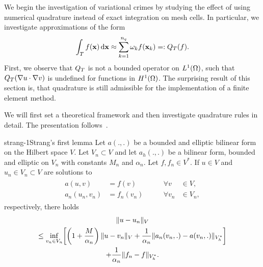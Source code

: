 \begin{intro}
  We begin the investigation of variational crimes by studying the
  effect of using numerical quadrature instead of exact integration on
  mesh cells. In particular, we investigate approximations of the form
  \begin{gather}
    \int_T f(\mathbf x)\,\mathrm{d} \mathbf x
    \approx \sum_{k=1}^{n_q} \omega_k f(\mathbf x_k) =: Q_T(f).
  \end{gather}
  First, we observe that $Q_T$ is not a bounded operator on
  $L^1(\Omega)$, such that $Q_T(\nabla u\cdot \nabla v)$ is
  undefined for functions in $H^1(\Omega)$. The surprising result of
  this section is, that quadrature is still admissible for the
  implementation of a finite element method.

  We will first set a theoretical framework and then investigate
  quadrature rules in detail. The presentation follows~\cite[Chapter
  4]{Ciarlet78}.
\end{intro}

\begin{Lemma*}{strang-1}{Strang's first lemma}
  Let $a(.,.)$ be a bounded and elliptic bilinear form on the Hilbert
  space $V$. Let $V_n\subset V$ and let $a_h(.,.)$ be a bilinear form,
  bounded and elliptic on $V_n$ with constants $M_n$ and
  $\alpha_n$. Let $f, f_n\in V^*$. If $u \in V$ and
  $u_n\in V_n \subset V$ are solutions to
  \begin{gather*}
    \begin{aligned}
      a(u,v) &= f(v) & \qquad\forall v&\in V,\\
      a_n(u_n,v_n) &= f_n(v_n) & \qquad\forall v_n&\in V_n,
    \end{aligned}
  \end{gather*}
  respectively, there holds
  \begin{multline}
    \lVert u-u_n\rVert_V \\
    \le \inf_{v_n\in V_n}\biggl[\left(1+\frac{M}{\alpha_n}\right)
    \lVert u-v_n\rVert_V
    + \frac1{\alpha_n}
    \lVert a_n(v_n,.)-a(v_n,.)\rVert_{V_h^*}\biggr]\\
         + \frac1{\alpha_n}\lVert f_n-f\rVert_{V_h^*}.
  \end{multline}
\end{Lemma*}

